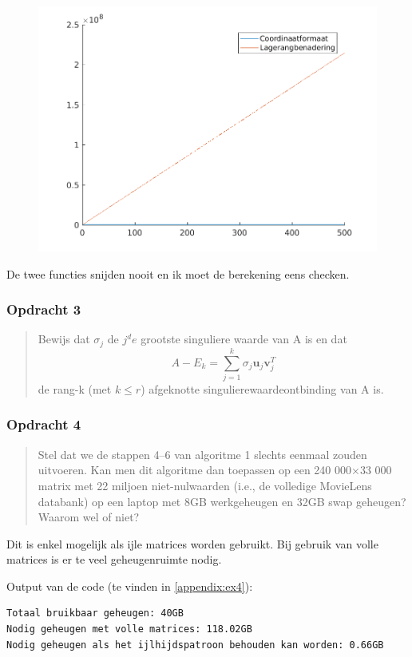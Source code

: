 \documentclass[11pt, a4paper, titlepage, openright]{article}
\begin{document}
	\begin{figure}[H]
		\centering
		\includegraphics[width=0.7\linewidth]{../ex2}
		\caption{}
		\label{fig:ex2}
	\end{figure}

    De twee functies snijden nooit en ik moet de berekening eens checken.

	\subsubsection{Opdracht 3}
    \begin{quote}
        Bewijs dat \(\sigma_j\) de \(j^de\) grootste singuliere waarde van A is en dat
        \[ A - E_k = \sum\limits_{j=1}^{k} \sigma_j \textbf{u}_j \textbf{v}_j^T \]
        de rang-k (met \( k \leq r \)) afgeknotte singulierewaardeontbinding van A is.
    \end{quote}

	\subsubsection{Opdracht 4}
    \begin{quote}
        Stel dat we de stappen 4–6 van algoritme 1 slechts eenmaal zouden uitvoeren.
        Kan men dit algoritme dan toepassen op een 240 000×33 000 matrix met 22 miljoen niet-nulwaarden
        (i.e., de volledige MovieLens databank) op een laptop met 8GB werkgeheugen en 32GB swap geheugen? Waarom wel of niet?
    \end{quote}

    Dit is enkel mogelijk als ijle matrices worden gebruikt. Bij gebruik van volle matrices is er te veel geheugenruimte nodig.

	Output van de code (te vinden in \ref{appendix:ex4}):
\begin{lstlisting}
Totaal bruikbaar geheugen: 40GB
Nodig geheugen met volle matrices: 118.02GB
Nodig geheugen als het ijlhijdspatroon behouden kan worden: 0.66GB
\end{lstlisting}
\end{document}
